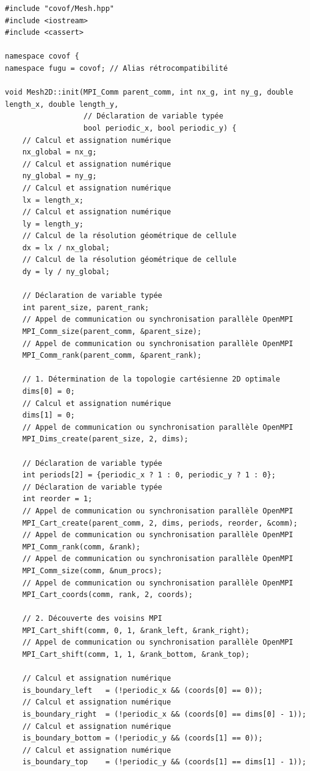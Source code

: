\documentclass[10pt,a4paper,oneside]{book}
\begin{document}
\begin{lstlisting}[language={[11]C++}]
#include "covof/Mesh.hpp"
#include <iostream>
#include <cassert>

namespace covof {
namespace fugu = covof; // Alias rétrocompatibilité

void Mesh2D::init(MPI_Comm parent_comm, int nx_g, int ny_g, double length_x, double length_y,
                  // Déclaration de variable typée
                  bool periodic_x, bool periodic_y) {
    // Calcul et assignation numérique
    nx_global = nx_g;
    // Calcul et assignation numérique
    ny_global = ny_g;
    // Calcul et assignation numérique
    lx = length_x;
    // Calcul et assignation numérique
    ly = length_y;
    // Calcul de la résolution géométrique de cellule
    dx = lx / nx_global;
    // Calcul de la résolution géométrique de cellule
    dy = ly / ny_global;

    // Déclaration de variable typée
    int parent_size, parent_rank;
    // Appel de communication ou synchronisation parallèle OpenMPI
    MPI_Comm_size(parent_comm, &parent_size);
    // Appel de communication ou synchronisation parallèle OpenMPI
    MPI_Comm_rank(parent_comm, &parent_rank);

    // 1. Détermination de la topologie cartésienne 2D optimale
    dims[0] = 0;
    // Calcul et assignation numérique
    dims[1] = 0;
    // Appel de communication ou synchronisation parallèle OpenMPI
    MPI_Dims_create(parent_size, 2, dims);

    // Déclaration de variable typée
    int periods[2] = {periodic_x ? 1 : 0, periodic_y ? 1 : 0};
    // Déclaration de variable typée
    int reorder = 1;
    // Appel de communication ou synchronisation parallèle OpenMPI
    MPI_Cart_create(parent_comm, 2, dims, periods, reorder, &comm);
    // Appel de communication ou synchronisation parallèle OpenMPI
    MPI_Comm_rank(comm, &rank);
    // Appel de communication ou synchronisation parallèle OpenMPI
    MPI_Comm_size(comm, &num_procs);
    // Appel de communication ou synchronisation parallèle OpenMPI
    MPI_Cart_coords(comm, rank, 2, coords);

    // 2. Découverte des voisins MPI
    MPI_Cart_shift(comm, 0, 1, &rank_left, &rank_right);
    // Appel de communication ou synchronisation parallèle OpenMPI
    MPI_Cart_shift(comm, 1, 1, &rank_bottom, &rank_top);

    // Calcul et assignation numérique
    is_boundary_left   = (!periodic_x && (coords[0] == 0));
    // Calcul et assignation numérique
    is_boundary_right  = (!periodic_x && (coords[0] == dims[0] - 1));
    // Calcul et assignation numérique
    is_boundary_bottom = (!periodic_y && (coords[1] == 0));
    // Calcul et assignation numérique
    is_boundary_top    = (!periodic_y && (coords[1] == dims[1] - 1));


\end{lstlisting}
\end{document}
